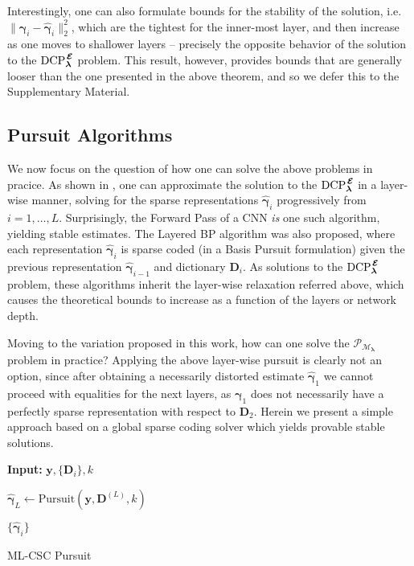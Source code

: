 \documentclass[10pt,journal]{IEEEtran}
\def\y{{\mathbf y}}
\def\D{{\mathbf D}}
\def\M{{\mathcal{M}}}
\def\P{{\mathcal{P}}}
\def\gama{{\boldsymbol \gamma}}
\def\lamda{{\boldsymbol \lambda}}
\def\vps{{\bm{\mathbf{\mathcal{E}}}}}
\def\DCPE{{\text{DCP}_\lamda^{\hspace{0.04cm} \vps}}}
\def\PM{{\P_{\M_\lamda}}}
\theoremstyle{plain}
\theoremstyle{definition}
\begin{document}
Interestingly, one can also formulate bounds for the stability of the solution, i.e. \mbox{$\|\gama_i - \hat{\gama}_i\|_2^2$}, which are the tightest for the inner-most layer, and then increase as one moves to shallower layers -- precisely the opposite behavior of the solution to the $\DCPE$ problem. This result, however, provides bounds that are generally looser than the one presented in the above theorem, and so we defer this to the Supplementary Material.


\subsection{Pursuit Algorithms}
\label{sec:Pursuit_Algorithms}

We now focus on the question of how one can solve the above problems in pracice.
As shown in \cite{Papyan2016convolutional}, one can approximate the solution to the $\DCPE$ in a layer-wise manner, solving for the sparse representations $\hat{\gama}_i$ progressively from $i=1,\dots,L$. Surprisingly, the Forward Pass of a CNN \emph{is} one such algorithm, yielding stable estimates. 
The Layered BP algorithm was also proposed, where each representation $\hat{\gama}_i$ is sparse coded (in a Basis Pursuit formulation) given the previous representation $\hat{\gama}_{i-1}$ and dictionary $\D_i$. As solutions to the $\DCPE$ problem, these algorithms inherit the layer-wise relaxation referred above, which causes the theoretical bounds to increase as a function of the layers or network depth.


Moving to the variation proposed in this work, how can one solve the $\PM$ problem in practice? Applying the above layer-wise pursuit is clearly not an option, since after obtaining a necessarily distorted estimate $\hat{\gama}_1$ we cannot proceed with equalities for the next layers, as $\gama_1$ does not necessarily have a perfectly sparse representation with respect to $\D_2$. Herein we present a simple approach based on a global sparse coding solver which yields provable stable solutions. 
\begin{algorithm}[h]
	\textbf{Input:} $\y,\{\D_i\},k$\;

	$\hat{\gama}_L \leftarrow \text{Pursuit}(\y,\D^{(L)},k) $\;
	
	\For{$j = L,\dots,1$}{
		$\hat{\gama}_{j-1} \leftarrow \D_j\hat{\gama}_j $
		}

	\Return $\{\hat{\gama}_i\}$\;
	\caption{ML-CSC Pursuit}
	\label{Alg:MulilayerPursuit}
\end{algorithm}
\end{document}

